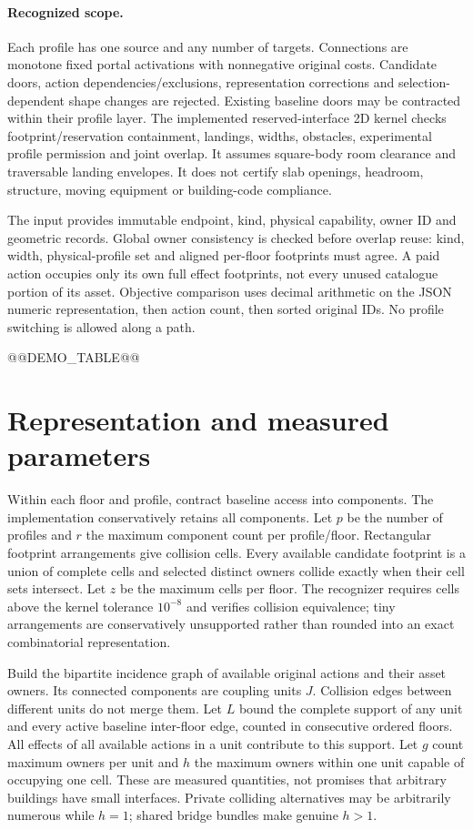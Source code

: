 \documentclass[10pt]{article}
\begin{document}
\paragraph{Recognized scope.}
Each profile has one source and any number of targets. Connections are monotone fixed portal activations with nonnegative original costs. Candidate doors, action dependencies/exclusions, representation corrections and selection-dependent shape changes are rejected. Existing baseline doors may be contracted within their profile layer. The implemented reserved-interface 2D kernel checks footprint/reservation containment, landings, widths, obstacles, experimental profile permission and joint overlap. It assumes square-body room clearance and traversable landing envelopes. It does not certify slab openings, headroom, structure, moving equipment or building-code compliance.

The input provides immutable endpoint, kind, physical capability, owner ID and geometric records. Global owner consistency is checked before overlap reuse: kind, width, physical-profile set and aligned per-floor footprints must agree. A paid action occupies only its own full effect footprints, not every unused catalogue portion of its asset. Objective comparison uses decimal arithmetic on the JSON numeric representation, then action count, then sorted original IDs. No profile switching is allowed along a path.

@@DEMO_TABLE@@

\section{Representation and measured parameters}
Within each floor and profile, contract baseline access into components. The implementation conservatively retains all components. Let $p$ be the number of profiles and $r$ the maximum component count per profile/floor. Rectangular footprint arrangements give collision cells. Every available candidate footprint is a union of complete cells and selected distinct owners collide exactly when their cell sets intersect. Let $z$ be the maximum cells per floor. The recognizer requires cells above the kernel tolerance $10^{-8}$ and verifies collision equivalence; tiny arrangements are conservatively unsupported rather than rounded into an exact combinatorial representation.

Build the bipartite incidence graph of available original actions and their asset owners. Its connected components are coupling units $J$. Collision edges between different units do not merge them. Let $L$ bound the complete support of any unit and every active baseline inter-floor edge, counted in consecutive ordered floors. All effects of all available actions in a unit contribute to this support. Let $g$ count maximum owners per unit and $h$ the maximum owners within one unit capable of occupying one cell. These are measured quantities, not promises that arbitrary buildings have small interfaces. Private colliding alternatives may be arbitrarily numerous while $h=1$; shared bridge bundles make genuine $h>1$.
\end{document}
